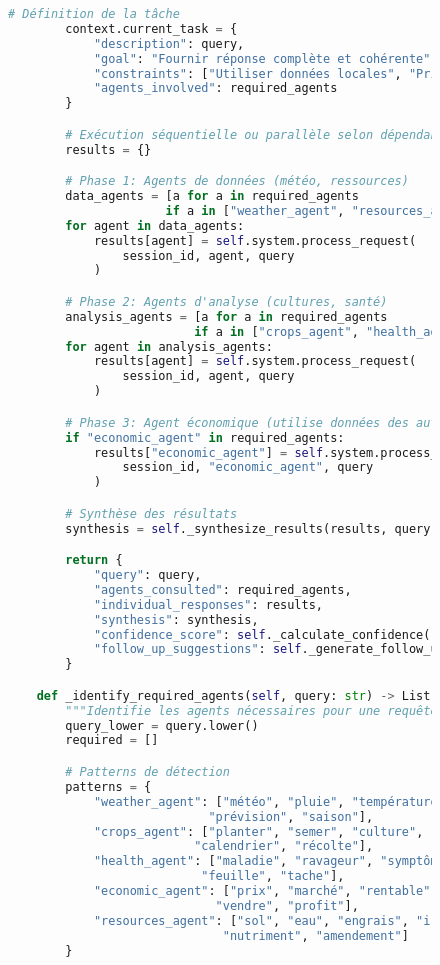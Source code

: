 \begin{figure}[H]
\begin{lstlisting}[language=Python, caption=Système de gestion du contexte inter-agents]
        # Définition de la tâche
        context.current_task = {
            "description": query,
            "goal": "Fournir réponse complète et cohérente",
            "constraints": ["Utiliser données locales", "Prioriser durabilité"],
            "agents_involved": required_agents
        }

        # Exécution séquentielle ou parallèle selon dépendances
        results = {}

        # Phase 1: Agents de données (météo, ressources)
        data_agents = [a for a in required_agents
                      if a in ["weather_agent", "resources_agent"]]
        for agent in data_agents:
            results[agent] = self.system.process_request(
                session_id, agent, query
            )

        # Phase 2: Agents d'analyse (cultures, santé)
        analysis_agents = [a for a in required_agents
                          if a in ["crops_agent", "health_agent"]]
        for agent in analysis_agents:
            results[agent] = self.system.process_request(
                session_id, agent, query
            )

        # Phase 3: Agent économique (utilise données des autres)
        if "economic_agent" in required_agents:
            results["economic_agent"] = self.system.process_request(
                session_id, "economic_agent", query
            )

        # Synthèse des résultats
        synthesis = self._synthesize_results(results, query, context)

        return {
            "query": query,
            "agents_consulted": required_agents,
            "individual_responses": results,
            "synthesis": synthesis,
            "confidence_score": self._calculate_confidence(results),
            "follow_up_suggestions": self._generate_follow_ups(results, context)
        }

    def _identify_required_agents(self, query: str) -> List[str]:
        """Identifie les agents nécessaires pour une requête."""
        query_lower = query.lower()
        required = []

        # Patterns de détection
        patterns = {
            "weather_agent": ["météo", "pluie", "température", "climat",
                            "prévision", "saison"],
            "crops_agent": ["planter", "semer", "culture", "variété",
                          "calendrier", "récolte"],
            "health_agent": ["maladie", "ravageur", "symptôme", "traitement",
                           "feuille", "tache"],
            "economic_agent": ["prix", "marché", "rentable", "coût",
                             "vendre", "profit"],
            "resources_agent": ["sol", "eau", "engrais", "irrigation",
                              "nutriment", "amendement"]
        }


\end{lstlisting}
\end{figure}

